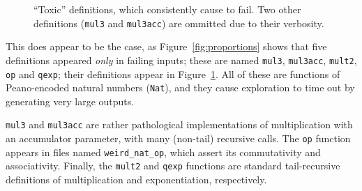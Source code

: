 \begin{figure}
  \iffalse
  \begin{verbatim}
    (define-fun-rec mul3 ((x Nat) (y Nat) (z Nat)) Nat
      (match x
        (case Z Z)                          ;; Base case for 0 * y * z
        (case (S x2)
          (match y
            (case Z Z)                      ;; Base case for x * 0 * z
            (case (S x3)
              (match z
                (case Z Z)                  ;; Base case for x * y * 0
                (case (S x4)
                  (match x2
                    (case Z
                      (match x3
                        (case Z
                          (match x4
                            (case Z (S Z))  ;; Base case for 1 * 1 * 1
                            (case (S x5)
                              (S (add3 (mul3 Z Z x4)
                                       (add3 (mul3 (S Z) Z x4)
                                             (mul3 Z (S Z) x4)
                                             (mul3 Z Z (S Z)))
                                       (add3 Z Z x4))))))
                        (case (S x6)
                          (S (add3 (mul3 Z x3 x4)
                                   (add3 (mul3 (S Z) x3 x4)
                                         (mul3 Z (S Z) x4)
                                         (mul3 Z x3 (S Z)))
                                   (add3 Z x3 x4))))))
                    (case (S x7)
                      (S (add3 (mul3 x2 x3 x4)
                               (add3 (mul3 (S Z) x3 x4)
                                     (mul3 x2 (S Z) x4)
                                     (mul3 x2 x3 (S Z)))
                               (add3 x2 x3 x4))))))))))))
  \end{verbatim}
  \fi
  \caption{``Toxic'' definitions, which consistently cause \qspec{} to fail. Two
    other definitions (\texttt{mul3} and \texttt{mul3acc}) are ommitted due to
    their verbosity.}
  \label{fig:faildefs}
\end{figure}

This does appear to be the case, as Figure~\ref{fig:proportions} shows that five
definitions appeared \emph{only} in failing inputs; these are named
\texttt{mul3}, \texttt{mul3acc}, \texttt{mult2}, \texttt{op} and \texttt{qexp};
their definitions appear in Figure~\ref{fig:faildefs}. All of these are
functions of Peano-encoded natural numbers (\texttt{Nat}), and they cause
exploration to time out by generating very large outputs.

\texttt{mul3} and \texttt{mul3acc} are rather pathological implementations of
multiplication with an accumulator parameter, with many (non-tail) recursive
calls. The \texttt{op} function appears in files named \texttt{weird\_nat\_op},
which assert its commutativity and associativity. Finally, the \texttt{mult2}
and \texttt{qexp} functions are standard tail-recursive definitions of
multiplication and exponentiation, respectively.

